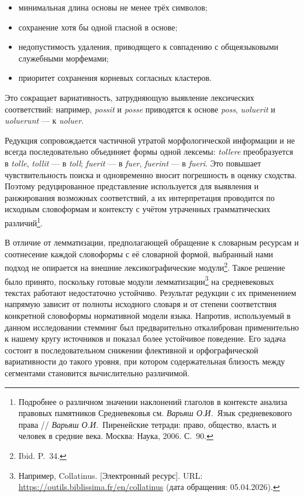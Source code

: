 \begin{itemize}
\item минимальная длина основы не менее трёх символов;
\item сохранение хотя бы одной гласной в основе;
\item недопустимость удаления, приводящего к совпадению с общеязыковыми служебными морфемами;
\item приоритет сохранения корневых согласных кластеров.
\end{itemize}
Это сокращает вариативность, затрудняющую выявление лексических соответствий: например, \emph{possit} и \emph{posse} приводятся к основе \emph{poss}, \emph{uoluerit} и \emph{uoluerunt} --- к \emph{uoluer}.

Редукция сопровождается частичной утратой морфологической информации и не всегда последовательно объединяет формы одной лексемы: \emph{tollere} преобразуется в \emph{tolle}, \emph{tollit} --- в \emph{toll}; \emph{fuerit} --- в \emph{fuer}, \emph{fuerint} --- в \emph{fueri}. Это повышает чувствительность поиска и одновременно вносит погрешность в оценку сходства. Поэтому редуцированное представление используется для выявления и ранжирования возможных соответствий, а их интерпретация проводится по исходным словоформам и контексту с учётом утраченных грамматических различий\footnote{Подробнее о различном значении наклонений глаголов в контексте анализа правовых памятников Средневековья см. \emph{Варьяш О.И.}~Язык средневекового права // \emph{Варьяш О.И.}~Пиренейские тетради: право, общество, власть и человек в средние века. Москва: Наука, 2006. С.~90.}.

В отличие от лемматизации, предполагающей обращение к словарным ресурсам и соотнесение каждой словоформы с её словарной формой, выбранный нами подход не опирается на внешние лексикографические модули\footnote{Ibid. P.~34.}. Такое решение было принято, поскольку готовые модули лемматизации\footnote{Например, Collatinus. [Электронный ресурс]. URL: \url{https://outils.biblissima.fr/en/collatinus} (дата обращения: 05.04.2026).} на средневековых текстах работают недостаточно устойчиво. Результат редукции с их применением напрямую зависит от полноты исходного словаря и от степени соответствия конкретной словоформы нормативной модели языка. Напротив, используемый в данном исследовании стемминг был предварительно откалиброван применительно к нашему кругу источников и показал более устойчивое поведение. Его задача состоит в последовательном снижении флективной и орфографической вариативности до такого уровня, при котором содержательная близость между сегментами становится вычислительно различимой.

